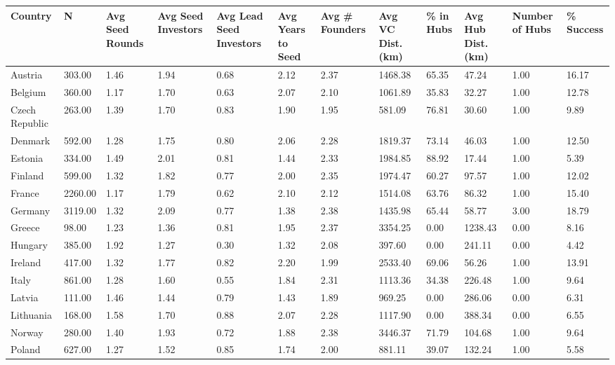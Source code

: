 \begin{table}[ht]
\centering
\begin{tabular}{llllllllllll}
  \toprule
Country & N & Avg Seed Rounds & Avg Seed Investors & Avg Lead Seed Investors & Avg Years to Seed & Avg \# Founders & Avg VC Dist. (km) & \% in Hubs & Avg Hub Dist. (km) & Number of Hubs & \% Success \\ 
  \midrule
Austria & 303.00 & 1.46 & 1.94 & 0.68 & 2.12 & 2.37 & 1468.38 & 65.35 & 47.24 & 1.00 & 16.17 \\ 
  Belgium & 360.00 & 1.17 & 1.70 & 0.63 & 2.07 & 2.10 & 1061.89 & 35.83 & 32.27 & 1.00 & 12.78 \\ 
  Czech Republic & 263.00 & 1.39 & 1.70 & 0.83 & 1.90 & 1.95 & 581.09 & 76.81 & 30.60 & 1.00 & 9.89 \\ 
  Denmark & 592.00 & 1.28 & 1.75 & 0.80 & 2.06 & 2.28 & 1819.37 & 73.14 & 46.03 & 1.00 & 12.50 \\ 
  Estonia & 334.00 & 1.49 & 2.01 & 0.81 & 1.44 & 2.33 & 1984.85 & 88.92 & 17.44 & 1.00 & 5.39 \\ 
  Finland & 599.00 & 1.32 & 1.82 & 0.77 & 2.00 & 2.35 & 1974.47 & 60.27 & 97.57 & 1.00 & 12.02 \\ 
  France & 2260.00 & 1.17 & 1.79 & 0.62 & 2.10 & 2.12 & 1514.08 & 63.76 & 86.32 & 1.00 & 15.40 \\ 
  Germany & 3119.00 & 1.32 & 2.09 & 0.77 & 1.38 & 2.38 & 1435.98 & 65.44 & 58.77 & 3.00 & 18.79 \\ 
  Greece & 98.00 & 1.23 & 1.36 & 0.81 & 1.95 & 2.37 & 3354.25 & 0.00 & 1238.43 & 0.00 & 8.16 \\ 
  Hungary & 385.00 & 1.92 & 1.27 & 0.30 & 1.32 & 2.08 & 397.60 & 0.00 & 241.11 & 0.00 & 4.42 \\ 
  Ireland & 417.00 & 1.32 & 1.77 & 0.82 & 2.20 & 1.99 & 2533.40 & 69.06 & 56.26 & 1.00 & 13.91 \\ 
  Italy & 861.00 & 1.28 & 1.60 & 0.55 & 1.84 & 2.31 & 1113.36 & 34.38 & 226.48 & 1.00 & 9.64 \\ 
  Latvia & 111.00 & 1.46 & 1.44 & 0.79 & 1.43 & 1.89 & 969.25 & 0.00 & 286.06 & 0.00 & 6.31 \\ 
  Lithuania & 168.00 & 1.58 & 1.70 & 0.88 & 2.07 & 2.28 & 1117.90 & 0.00 & 388.34 & 0.00 & 6.55 \\ 
  Norway & 280.00 & 1.40 & 1.93 & 0.72 & 1.88 & 2.38 & 3446.37 & 71.79 & 104.68 & 1.00 & 9.64 \\ 
  Poland & 627.00 & 1.27 & 1.52 & 0.85 & 1.74 & 2.00 & 881.11 & 39.07 & 132.24 & 1.00 & 5.58 \\ 

\end{tabular}
\end{table}
